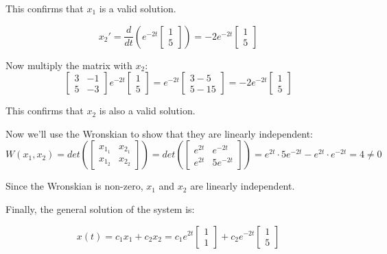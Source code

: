 \documentclass{article}
\begin{document}
This confirms that $x_1$ is a valid solution.

\[x_2' = \frac{d}{dt}\left( e^{-2t} \begin{bmatrix}
    1 \\
    5
\end{bmatrix} \right) = -2 e^{-2t} \begin{bmatrix}
    1 \\
    5
\end{bmatrix}\]

Now multiply the matrix with $x_2$:
\[\begin{bmatrix}
    3 & -1 \\
    5 & -3
\end{bmatrix} e^{-2t} \begin{bmatrix}
    1 \\
    5
\end{bmatrix} = e^{-2t} \begin{bmatrix}
    3-5 \\
    5-15
\end{bmatrix} = -2 e^{-2t} \begin{bmatrix}
    1 \\
    5
\end{bmatrix}\]

This confirms that $x_2$ is also a valid solution.

Now we'll use the Wronskian to show that they are linearly independent:
\[W(x_1, x_2) = det \left( \begin{bmatrix}
    x_{1_1} & x_{2_1} \\
    x_{1_2} & x_{2_2}
\end{bmatrix} \right) = det \left( \begin{bmatrix}
    e^{2t} & e^{-2t} \\
    e^{2t} & 5e^{-2t}
\end{bmatrix} \right) = e^{2t} \cdot 5e^{-2t} - e^{2t} \cdot e^{-2t} = 4 \neq 0\]

Since the Wronskian is non-zero, $x_1$ and $x_2$ are linearly independent.

Finally, the general solution of the system is:

\[x(t) = c_1 x_1 + c_2 x_2 = c_1 e^{2t} \begin{bmatrix}
    1 \\
    1
\end{bmatrix} + c_2 e^{-2t} \begin{bmatrix}
    1 \\
    5
\end{bmatrix}\]
\end{document}
